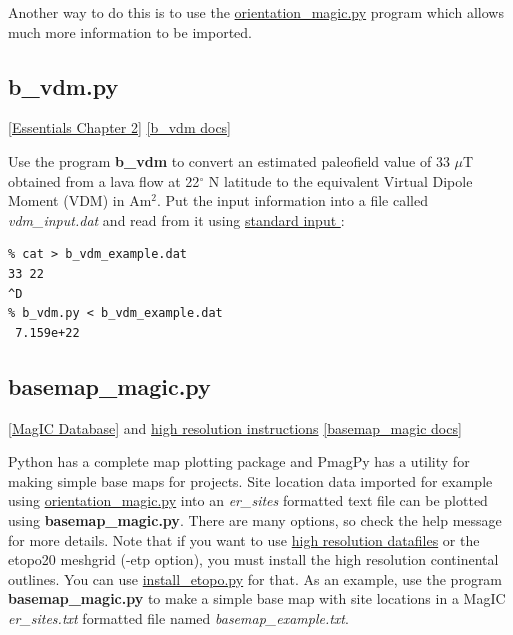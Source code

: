 \documentclass[11pt]{book}
\begin{document}
{{Another way to do this is to use the \href{#orientation_magic.py}{orientation\_magic.py} program which allows much more information to be imported.


\subsection{b\_vdm.py}
\href{http://earthref.org/MAGIC/books/Tauxe/Essentials/WebBook3ch2.html#Virtual_dipole_moment}{[Essentials Chapter 2]}
\href{https://github.com/PmagPy/PmagPy/blob/master/programs/b_vdm.py}{[b\_vdm docs]}

Use the program {\bf b\_vdm} to convert an estimated paleofield value of 33 $\mu$T obtained from a lava flow at 22$^{\circ}$ N latitude to the equivalent Virtual Dipole Moment (VDM) in Am$^2$.   Put the input information into a file called {\it vdm\_input.dat}  and read from it using  \href{#standard_IO}{standard input }:

\begin{verbatim}
% cat > b_vdm_example.dat
33 22
^D
% b_vdm.py < b_vdm_example.dat
 7.159e+22
\end{verbatim}


\subsection{basemap\_magic.py}
\label{ex:basemap_magic}
\href{#MagICDatabase}{[MagIC Database]} and   \href{#HighRes}{high resolution instructions}
\href{https://github.com/PmagPy/PmagPy/blob/master/programs/basemap_magic.py}{[basemap\_magic docs]}

Python has a complete map plotting package and PmagPy has a utility for making simple base maps for projects.  Site location data imported for example using \href{#orientation_magic.py}{orientation\_magic.py} into an {\it er\_sites} formatted text file can be plotted using {\bf basemap\_magic.py}.  There are many options, so check the help message for more details.   Note that if you want to use  \href{#hires}{high resolution datafiles}
 or the etopo20 meshgrid (-etp option), you must install the high resolution continental outlines.  You can use \href{#install_etopo.py}{install\_etopo.py}  for that.
As an example, use the program {\bf basemap\_magic.py} to make  a simple base map  with site locations in a MagIC {\it er\_sites.txt}  formatted file named {\it basemap\_example.txt}.

}}
\end{document}
